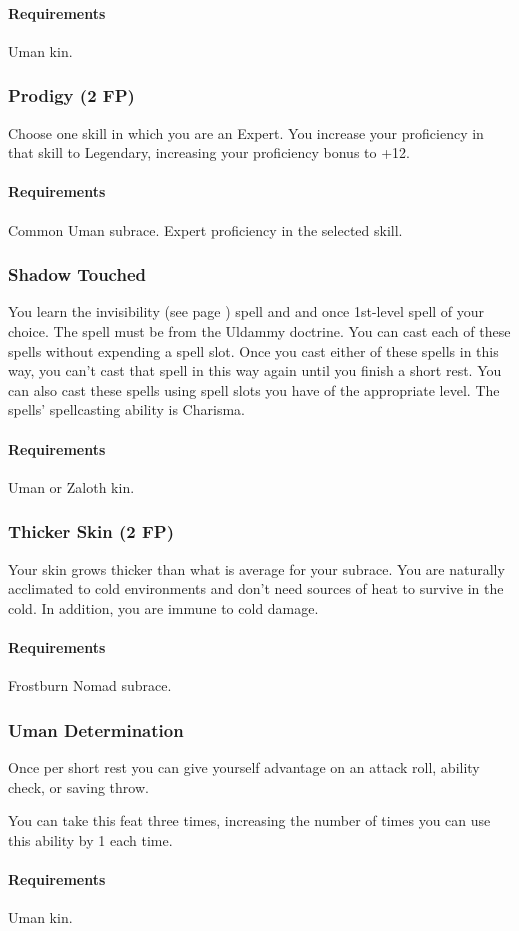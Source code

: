         \paragraph{Requirements} Uman kin.
    \subsubsection{Prodigy (2 FP)} \label{feat::prodigy}
        Choose one skill in which you are an Expert.
        You increase your proficiency in that skill to Legendary, increasing your proficiency bonus to +12.
        \paragraph{Requirements} Common Uman subrace. Expert proficiency in the selected skill.
    \subsubsection{Shadow Touched} \label{feat::shadowtouched} %
        You learn the invisibility (see page \pageref{spell::invisibility}) spell and and once 1st-level spell of your choice.
        The spell must be from the Uldammy doctrine.
        You can cast each of these spells without expending a spell slot.
        Once you cast either of these spells in this way, you can't cast that spell in this way again until you finish a short rest.
        You can also cast these spells using spell slots you have of the appropriate level.
        The spells' spellcasting ability is Charisma.
        \paragraph{Requirements} Uman or Zaloth kin.
    \subsubsection{Thicker Skin (2 FP)} \label{feat::thickerskin}
        Your skin grows thicker than what is average for your subrace.
        You are naturally acclimated to cold environments and don't need sources of heat to survive in the cold.
        In addition, you are immune to cold damage.
        \paragraph{Requirements} Frostburn Nomad subrace.
    \subsubsection{Uman Determination} \label{feat::umandetermination}
        Once per short rest you can give yourself advantage on an attack roll, ability check, or saving throw.

        You can take this feat three times, increasing the number of times you can use this ability by 1 each time.
        \paragraph{Requirements} Uman kin.

\newpage~\newpage
